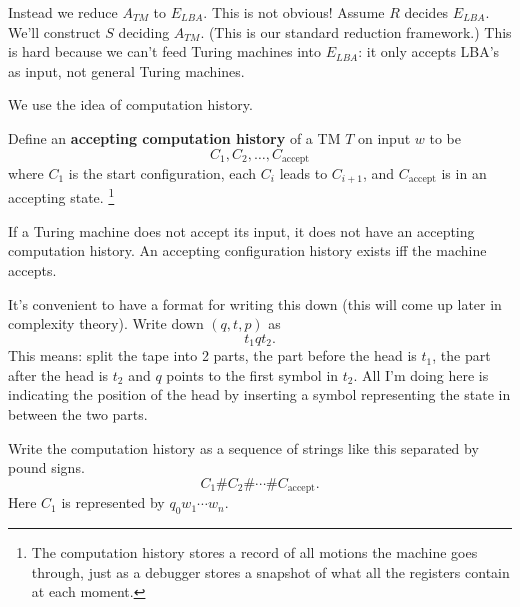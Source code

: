 Instead we reduce $A_{TM}$ to $E_{LBA}$. This is not obvious! Assume $R$ decides $E_{LBA}$. We'll construct $S$ deciding $A_{TM}$. (This is our standard reduction framework.) This is hard because we can't feed Turing machines into $E_{LBA}$: it only accepts LBA's as input, not general Turing machines.

We use the idea of computation history. 
\begin{df}Define an \textbf{accepting computation history} of a TM $T$ on input $w$ to be 
\[
C_1,C_2,\ldots, C_{\text{accept}}
\]
where $C_1$ is the start configuration, each $C_i$ leads to $C_{i+1}$, and $C_{\text{accept}}$ is in an accepting state.
\footnote{The computation history stores a record of all motions the machine goes through, just as a debugger stores a snapshot of what all the registers contain at each moment.}
\end{df}
If a Turing machine does not accept its input, it does not have an accepting computation history. 
An accepting configuration history exists iff the machine accepts.


It's convenient to have a format for writing this down (this will come up later in complexity theory). Write down $(q,t,p)$ as \[t_1qt_2.\] This means: split the tape into 2 parts, the part before the head is $t_1$, the part after the head is $t_2$ and $q$ points to the first symbol in $t_2$. All I'm doing here is indicating the position of the head by inserting a symbol representing the state in between the two parts.

Write the computation history as a sequence of strings like this separated by pound signs.
\[
C_1\#C_2\#\cdots \# C_{\text{accept}}.
\]
Here $C_1$ is represented by $q_0w_1\cdots w_n$.


